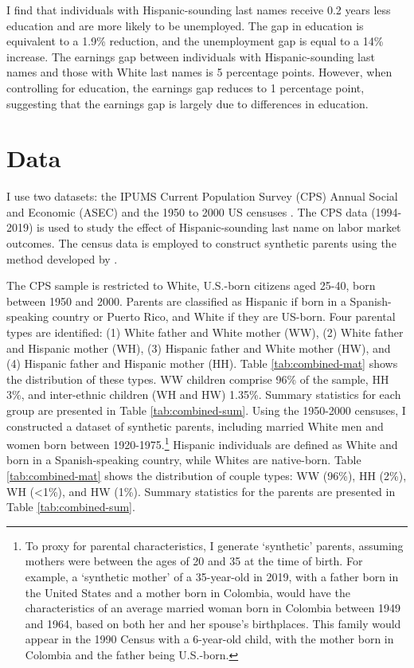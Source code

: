 \documentclass[a4paper,fleqn]{cas-sc}
\begin{document}
I find that individuals with Hispanic-sounding last names receive 0.2 years less education and are more likely to be unemployed. The gap in education is equivalent to a 1.9\% reduction, and the unemployment gap is equal to a 14\% increase. The earnings gap between individuals with Hispanic-sounding last names and those with White last names is 5 percentage points. However, when controlling for education, the earnings gap reduces to 1 percentage point, suggesting that the earnings gap is largely due to differences in education.

\section{Data}\label{sec:data}

I use two datasets: the IPUMS Current Population Survey (CPS) Annual Social and Economic (ASEC) \citep{cps2019} and the 1950 to 2000 US censuses \citep{acs2019}. The CPS data (1994-2019) is used to study the effect of Hispanic-sounding last name on labor market outcomes. The census data is employed to construct synthetic parents using the method developed by \citet{rubinstein2014pride}.

The CPS sample is restricted to White, U.S.-born citizens aged 25-40, born between 1950 and 2000. Parents are classified as Hispanic if born in a Spanish-speaking country or Puerto Rico, and White if they are US-born. Four parental types are identified: (1) White father and White mother (WW), (2) White father and Hispanic mother (WH), (3) Hispanic father and White mother (HW), and (4) Hispanic father and Hispanic mother (HH). Table \ref{tab:combined-mat} shows the distribution of these types. WW children comprise 96\% of the sample, HH 3\%, and inter-ethnic children (WH and HW) 1.35\%. Summary statistics for each group are presented in Table \ref{tab:combined-sum}. Using the 1950-2000 censuses, I constructed a dataset of synthetic parents, including married White men and women born between 1920-1975.\footnote{To proxy for parental characteristics, I generate `synthetic' parents, assuming mothers were between the ages of 20 and 35 at the time of birth. For example, a `synthetic mother' of a 35-year-old in 2019, with a father born in the United States and a mother born in Colombia, would have the characteristics of an average married woman born in Colombia between 1949 and 1964, based on both her and her spouse's birthplaces. This family would appear in the 1990 Census with a 6-year-old child, with the mother born in Colombia and the father being U.S.-born.} Hispanic individuals are defined as White and born in a Spanish-speaking country, while Whites are native-born. Table \ref{tab:combined-mat} shows the distribution of couple types: WW (96\%), HH (2\%), WH (<1\%), and HW (1\%). Summary statistics for the parents are presented in Table \ref{tab:combined-sum}.
\end{document}
